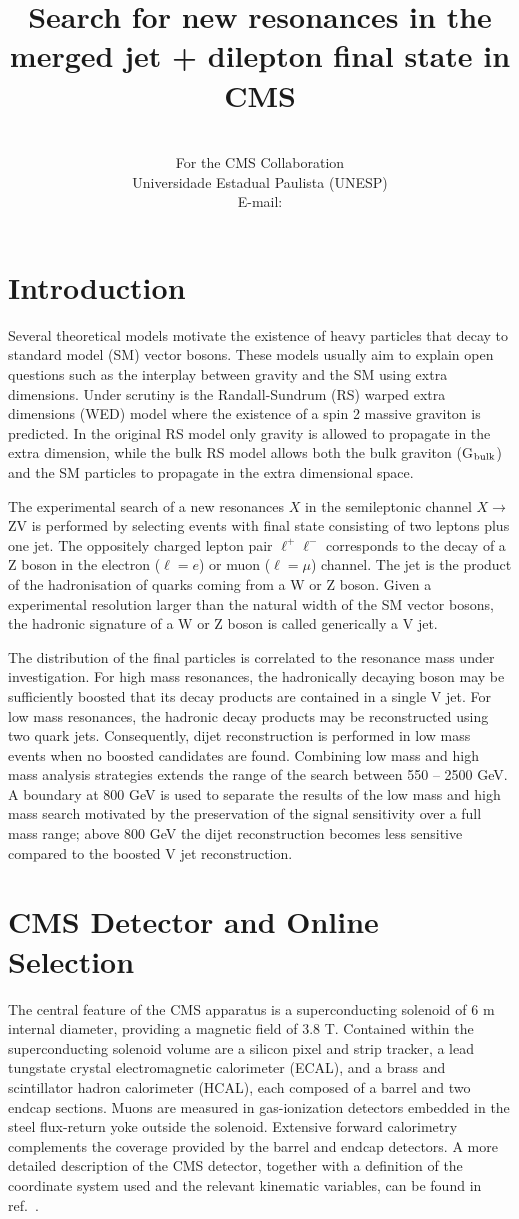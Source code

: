 \documentclass{PoS}
\title{Search for new resonances in the\\ merged jet + dilepton final state in CMS}
\author{\speaker{J. C. Ruiz Vargas}\\%
        {\rm For the CMS Collaboration}\\
        Universidade Estadual Paulista (UNESP)\\
        E-mail: \email{jruizvar@cern.ch}}
\begin{document}
\section{Introduction}
Several theoretical models motivate the existence of heavy particles that decay to standard model (SM) vector bosons. These models usually aim to explain open questions such as the interplay between gravity and the SM using extra dimensions. Under scrutiny is the Randall-Sundrum (RS) warped extra dimensions (WED) model \cite{Randall:1999ee,Randall:1999vf} where the existence of a spin 2 massive graviton is predicted. In the original RS model only gravity is allowed to propagate in the extra dimension, while the bulk RS model allows both the bulk graviton (G$_{\rm bulk}$) and the SM particles to propagate in the extra dimensional space.

The experimental search of a new resonances $X$ in the semileptonic channel $X \rightarrow$ ZV is performed by selecting events with final state consisting of two leptons plus one jet. The oppositely charged lepton pair $\ell^{+}\ell^{-}$ corresponds to the decay of a Z boson in the electron ($\ell = e$) or muon ($\ell = \mu$) channel. The jet is the product of the hadronisation of quarks coming from a W or Z boson. Given a experimental resolution larger than the natural width of the SM vector bosons, the hadronic signature of a W or Z boson is called generically a V jet.

The distribution of the final particles is correlated to the resonance mass under investigation. For high mass resonances, the hadronically decaying boson may be sufficiently boosted that its decay products are contained in a single V jet. 
For low mass resonances, the hadronic decay products may be reconstructed using two quark jets. Consequently, dijet reconstruction is performed in low mass events when no boosted candidates are found. Combining low mass and high mass analysis strategies extends the range of the search between 550 -- 2500 GeV.  A boundary at 800 GeV is used to separate the results of the low mass and high mass search motivated by the preservation of the signal sensitivity over a full mass range; above 800 GeV the dijet reconstruction becomes less sensitive compared to the boosted V jet reconstruction.

\section{CMS Detector and Online Selection}
The central feature of the CMS apparatus is a superconducting solenoid of 6 m internal diameter, providing a magnetic field of 3.8 T. Contained within the superconducting solenoid volume are a silicon pixel and strip tracker, a lead tungstate crystal electromagnetic calorimeter (ECAL), and a brass and scintillator hadron calorimeter (HCAL), each composed of a barrel and two endcap sections. Muons are measured in gas-ionization detectors embedded in the steel flux-return yoke outside the solenoid. Extensive forward calorimetry complements the coverage provided by the barrel and endcap detectors. A more detailed description of the CMS detector, together with a definition of the coordinate system used and the relevant kinematic variables, can be found in ref.~\cite{Chatrchyan:2008aa}.
\end{document}
